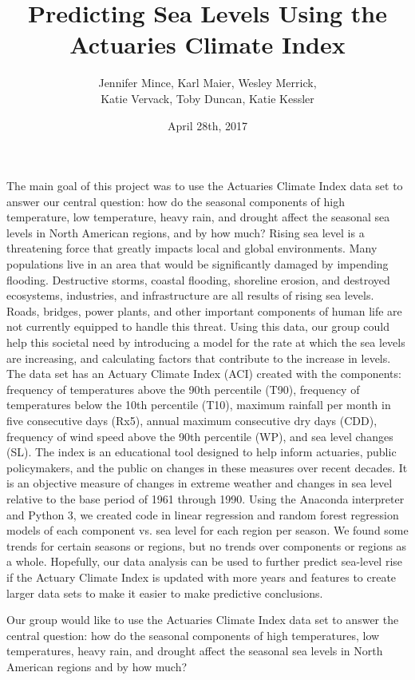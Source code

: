 \documentclass[12pt]{report}
\title{Predicting Sea Levels Using the Actuaries Climate Index}
\date{April 28th, 2017}
\author{Jennifer Mince, Karl Maier, Wesley Merrick,\\ Katie Vervack, Toby Duncan, Katie Kessler}
\begin{document}
	\maketitle
		
		\par The main goal of this project was to use the Actuaries Climate Index data set to answer our central question: how do the seasonal components of high temperature, low temperature, heavy rain, and drought affect the seasonal sea levels in North American regions, and by how much? Rising sea level is a threatening force that greatly impacts local and global environments. Many populations live in an area that would be significantly damaged by impending flooding. Destructive storms, coastal flooding, shoreline erosion, and destroyed ecosystems, industries, and infrastructure are all results of rising sea levels. Roads, bridges, power plants, and other important components of human life are not currently equipped to handle this threat. 
		Using this data, our group could help this societal need by introducing a model for the rate at which the sea levels are increasing, and calculating factors that contribute to the increase in levels. The data set has an Actuary Climate Index (ACI) created with the components: frequency of temperatures above the 90th percentile (T90), frequency of temperatures below the 10th percentile (T10), maximum rainfall per month in five consecutive days (Rx5), annual maximum consecutive dry days (CDD), frequency of wind speed above the 90th percentile (WP), and sea level changes (SL). The index is an educational tool designed to help inform actuaries, public policymakers, and the public on changes in these measures over recent decades.  It is an objective measure of changes in extreme weather and changes in sea level relative to the base period of 1961 through 1990. Using the Anaconda interpreter and Python 3, we created code in linear regression and random forest regression models of each component vs. sea level for each region per season. We found some trends for certain seasons or regions, but no trends over components or regions as a whole. Hopefully, our data analysis can be used to further predict sea-level rise if the Actuary Climate Index is updated with more years and features to create larger data sets to make it easier to make predictive conclusions. 
		\par Our group would like to use the Actuaries Climate Index data set to answer the central question: how do the seasonal components of high temperatures, low temperatures, heavy rain, and drought affect the seasonal sea levels in North American regions and by how much?
\end{document}

